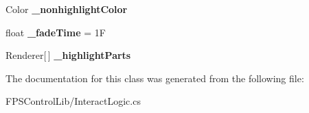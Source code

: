 \begin{DoxyCompactItemize}
\item 
\hypertarget{class_f_p_s_control_1_1_interact_logic_abdb6c99f769645f3f4d0419269b10729}{Color {\bfseries \-\_\-nonhighlight\-Color}}\label{class_f_p_s_control_1_1_interact_logic_abdb6c99f769645f3f4d0419269b10729}

\item 
\hypertarget{class_f_p_s_control_1_1_interact_logic_a3e4bf7a00513d9c322d336f539c4fb1c}{float {\bfseries \-\_\-fade\-Time} = 1\-F}\label{class_f_p_s_control_1_1_interact_logic_a3e4bf7a00513d9c322d336f539c4fb1c}

\item 
\hypertarget{class_f_p_s_control_1_1_interact_logic_ab3a2e2efd39baee50837479bd2ed6385}{Renderer\mbox{[}$\,$\mbox{]} {\bfseries \-\_\-highlight\-Parts}}\label{class_f_p_s_control_1_1_interact_logic_ab3a2e2efd39baee50837479bd2ed6385}

\end{DoxyCompactItemize}


The documentation for this class was generated from the following file\-:\begin{DoxyCompactItemize}
\item 
F\-P\-S\-Control\-Lib/Interact\-Logic.\-cs\end{DoxyCompactItemize}
